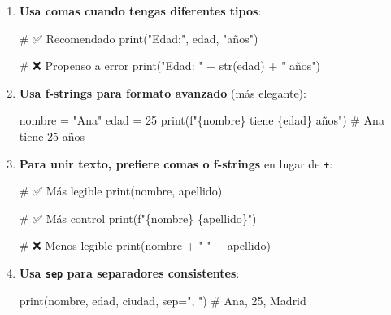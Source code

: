 \documentclass[
  doc,
  floatsintext,
  longtable,
  a4paper,
  nolmodern,
  notxfonts,
  notimes,
  12pt,
  colorlinks=true,linkcolor=blue,citecolor=blue,urlcolor=blue]{apa7}
\newenvironment{Shaded}{\begin{snugshade}}{\end{snugshade}}
\newcommand{\BuiltInTok}[1]{\textcolor[rgb]{0.00,0.23,0.31}{#1}}
\newcommand{\CommentTok}[1]{\textcolor[rgb]{0.37,0.37,0.37}{#1}}
\newcommand{\DecValTok}[1]{\textcolor[rgb]{0.68,0.00,0.00}{#1}}
\newcommand{\NormalTok}[1]{\textcolor[rgb]{0.00,0.23,0.31}{#1}}
\newcommand{\OperatorTok}[1]{\textcolor[rgb]{0.37,0.37,0.37}{#1}}
\newcommand{\SpecialCharTok}[1]{\textcolor[rgb]{0.37,0.37,0.37}{#1}}
\newcommand{\SpecialStringTok}[1]{\textcolor[rgb]{0.13,0.47,0.30}{#1}}
\newcommand{\StringTok}[1]{\textcolor[rgb]{0.13,0.47,0.30}{#1}}
\begin{document}
\begin{enumerate}
\def\labelenumi{\arabic{enumi}.}
\item
  \textbf{Usa comas cuando tengas diferentes tipos}:

\begin{Shaded}
\begin{Highlighting}[]
\CommentTok{\# ✅ Recomendado}
\BuiltInTok{print}\NormalTok{(}\StringTok{"Edad:"}\NormalTok{, edad, }\StringTok{"años"}\NormalTok{)}

\CommentTok{\# ❌ Propenso a error}
\BuiltInTok{print}\NormalTok{(}\StringTok{"Edad: "} \OperatorTok{+} \BuiltInTok{str}\NormalTok{(edad) }\OperatorTok{+} \StringTok{" años"}\NormalTok{)}
\end{Highlighting}
\end{Shaded}
\item
  \textbf{Usa f-strings para formato avanzado} (más elegante):

\begin{Shaded}
\begin{Highlighting}[]
\NormalTok{nombre }\OperatorTok{=} \StringTok{"Ana"}
\NormalTok{edad }\OperatorTok{=} \DecValTok{25}
\BuiltInTok{print}\NormalTok{(}\SpecialStringTok{f"}\SpecialCharTok{\{}\NormalTok{nombre}\SpecialCharTok{\}}\SpecialStringTok{ tiene }\SpecialCharTok{\{}\NormalTok{edad}\SpecialCharTok{\}}\SpecialStringTok{ años"}\NormalTok{)  }\CommentTok{\# Ana tiene 25 años}
\end{Highlighting}
\end{Shaded}
\item
  \textbf{Para unir texto, prefiere comas o f-strings} en lugar de
  \texttt{+}:

\begin{Shaded}
\begin{Highlighting}[]
\CommentTok{\# ✅ Más legible}
\BuiltInTok{print}\NormalTok{(nombre, apellido)}

\CommentTok{\# ✅ Más control}
\BuiltInTok{print}\NormalTok{(}\SpecialStringTok{f"}\SpecialCharTok{\{}\NormalTok{nombre}\SpecialCharTok{\}}\SpecialStringTok{ }\SpecialCharTok{\{}\NormalTok{apellido}\SpecialCharTok{\}}\SpecialStringTok{"}\NormalTok{)}

\CommentTok{\# ❌ Menos legible}
\BuiltInTok{print}\NormalTok{(nombre }\OperatorTok{+} \StringTok{" "} \OperatorTok{+}\NormalTok{ apellido)}
\end{Highlighting}
\end{Shaded}
\item
  \textbf{Usa \texttt{sep} para separadores consistentes}:

\begin{Shaded}
\begin{Highlighting}[]
\BuiltInTok{print}\NormalTok{(nombre, edad, ciudad, sep}\OperatorTok{=}\StringTok{", "}\NormalTok{)}
\CommentTok{\# Ana, 25, Madrid}
\end{Highlighting}
\end{Shaded}
\end{enumerate}
\end{document}
